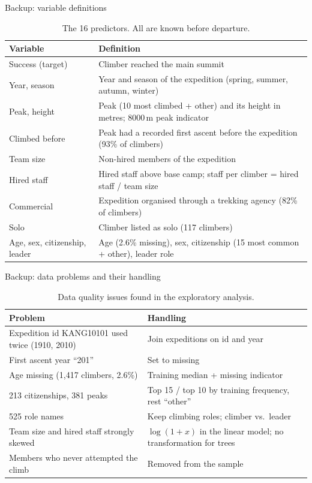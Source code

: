 \documentclass[aspectratio=169,10pt,t]{beamer}
\begin{document}
\begin{frame}{Backup: variable definitions}
\begin{table}
\scriptsize
\renewcommand{\arraystretch}{1.15}
\begin{tabular}{p{}p{}}
\toprule
Variable & Definition \\
\midrule
Success (target) & Climber reached the main summit \\
Year, season & Year and season of the expedition (spring, summer, autumn, winter) \\
Peak, height & Peak (10 most climbed + other) and its height in metres; 8000\,m peak indicator \\
Climbed before & Peak had a recorded first ascent before the expedition (93\% of climbers) \\
Team size & Non-hired members of the expedition \\
Hired staff & Hired staff above base camp; staff per climber = hired staff / team size \\
Commercial & Expedition organised through a trekking agency (82\% of climbers) \\
Solo & Climber listed as solo (117 climbers) \\
Age, sex, citizenship, leader & Age (2.6\% missing), sex, citizenship (15 most common + other), leader role \\
\bottomrule
\end{tabular}
\caption{The 16 predictors. All are known before departure.}
\end{table}
\end{frame}

\begin{frame}{Backup: data problems and their handling}
\begin{table}
\footnotesize
\begin{tabular}{p{}p{}}
\toprule
Problem & Handling \\
\midrule
Expedition id KANG10101 used twice (1910, 2010) & Join expeditions on id and year \\
First ascent year ``201'' & Set to missing \\
Age missing (1,417 climbers, 2.6\%) & Training median + missing indicator \\
213 citizenships, 381 peaks & Top 15 / top 10 by training frequency, rest ``other'' \\
525 role names & Keep climbing roles; climber vs.\ leader \\
Team size and hired staff strongly skewed & $\log(1+x)$ in the linear model; no transformation for trees \\
Members who never attempted the climb & Removed from the sample \\
\bottomrule
\end{tabular}
\caption{Data quality issues found in the exploratory analysis.}
\end{table}
\end{frame}
\end{document}
